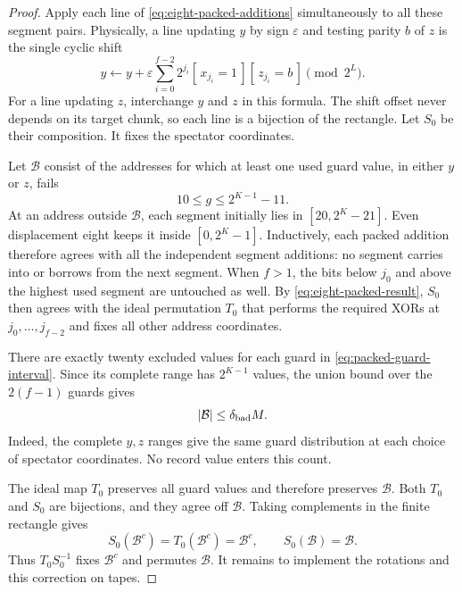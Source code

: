\documentclass[11pt]{article}
\theoremstyle{definition}
\begin{document}
\begin{proof}
Apply each line of \eqref{eq:eight-packed-additions} simultaneously to all
these segment pairs. Physically, a line updating $y$ by sign $\varepsilon$
and testing parity $b$ of $z$ is the single cyclic shift
\begin{equation}
\label{eq:packed-cyclic-shift}
 y\longleftarrow y+
 \varepsilon\sum_{i=0}^{f-2}2^{j_i}
 [\,x_{j_i}=1\,][\,z_{j_i}=b\,]
 \pmod{2^L}.
\end{equation}
For a line updating $z$, interchange $y$ and $z$ in this formula.
The shift offset never depends on its target chunk, so each line is a
bijection of the rectangle. Let $S_0$ be their composition. It fixes
the spectator coordinates.

Let $\mathcal B$ consist of the addresses for which
at least one used guard value, in either $y$ or $z$, fails
\begin{equation}
\label{eq:packed-guard-interval}
 10\le g\le 2^{K-1}-11.
\end{equation}
At an address outside $\mathcal B$, each segment initially lies in
$[20,2^K-21]$. Even displacement eight keeps it inside
$[0,2^K-1]$. Inductively, each packed addition therefore agrees with all
the independent segment additions: no segment carries into or borrows
from the next segment. When $f>1$, the bits below $j_0$ and above the
highest used segment are untouched as well. By
\eqref{eq:eight-packed-result}, $S_0$
then agrees with the ideal permutation $T_0$ that performs the required
XORs at $j_0,\ldots,j_{f-2}$ and fixes all other address coordinates.

There are exactly twenty excluded values for each guard in
\eqref{eq:packed-guard-interval}. Since its complete range has
$2^{K-1}$ values, the union bound over the $2(f-1)$ guards gives
\begin{equation}
\label{eq:packed-bad-fraction}
 |\mathcal B|\le\delta_{\rm bad}M.
\end{equation}
Indeed, the complete $y,z$ ranges give the same guard distribution at
each choice of spectator coordinates. No record value enters this count.

The ideal map $T_0$ preserves all guard values and therefore preserves
$\mathcal B$. Both $T_0$ and $S_0$ are bijections, and they agree off
$\mathcal B$. Taking complements in the finite rectangle gives
\[
 S_0(\mathcal B^c)=T_0(\mathcal B^c)=\mathcal B^c,
 \qquad S_0(\mathcal B)=\mathcal B.
\]
Thus $T_0S_0^{-1}$ fixes $\mathcal B^c$ and permutes $\mathcal B$.
It remains to implement the rotations and this correction on tapes.


\end{proof}
\end{document}
